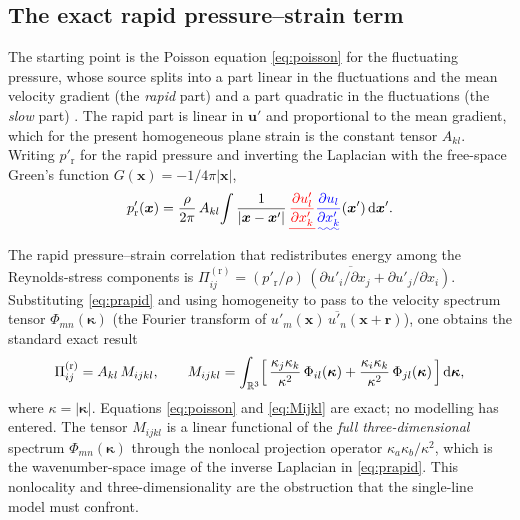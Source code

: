 \documentclass[lineno]{JFM-FLM_Au}
\providecommand{\DIFadd}[1]{{\protect\color{blue}\uwave{#1}}} %
\providecommand{\DIFdel}[1]{{\protect\color{red}\sout{#1}}} %
\providecommand{\DIFaddbegin}{} %
\providecommand{\DIFaddend}{} %
\providecommand{\DIFdelbegin}{} %
\providecommand{\DIFdelend}{} %
\begin{document}
\subsection{The exact rapid pressure--strain term}\label{sec:exact-pi}

The starting point is the Poisson equation \eqref{eq:poisson} for the
fluctuating pressure, whose source splits into a part linear in the
fluctuations and the mean velocity gradient (the \emph{rapid} part) and a
part quadratic in the fluctuations (the \emph{slow} part)
\citep{Pope2000}. The rapid part is linear in $\boldsymbol{u}'$ and
proportional to the mean gradient, which for the present homogeneous
plane strain is the constant tensor $A_{kl}$. Writing
$p'_{\mathrm r}$ for the rapid pressure and inverting the Laplacian with the
free-space Green's function $G(\boldsymbol{x})=-1/4\pi|\boldsymbol{x}|$,
\begin{equation}
  p'_{\mathrm r}(\boldsymbol{x})
  = \frac{\rho}{2\pi}\,A_{kl}\!\int
    \frac{1}{|\boldsymbol{x}-\boldsymbol{x}'|}\,
    \DIFdelbegin \DIFdel{\frac{\partial u'_l}{\partial x'_k}}\DIFdelend \DIFaddbegin \DIFadd{\frac{\partial u_l}{\partial x'_k}}\DIFaddend (\boldsymbol{x}')\,
    \mathrm{d}\boldsymbol{x}' .
  \label{eq:prapid}
\end{equation}
The rapid pressure--strain correlation that redistributes energy among the
Reynolds-stress components is
\DIFdelbegin \DIFdel{$\Pi^{(\mathrm r)}_{ij}
   = \overline{(p'_{\mathrm r}/\rho)\,(\partial u'_i/\partial x_j
     + \partial u'_j/\partial x_i)}$}\DIFdelend \DIFaddbegin \DIFadd{$\Pi^{(\mathrm r)}_{ij}
   = \overline{(p'_{\mathrm r}/\rho)\,(\partial u_i/\partial x_j
     + \partial u_j/\partial x_i)}$}\DIFaddend .
Substituting \eqref{eq:prapid} and using homogeneity to pass to the
velocity spectrum tensor
$\Phi_{mn}(\boldsymbol{\kappa})$
(the Fourier transform of \DIFdelbegin \DIFdel{$\overline{u'_m(\boldsymbol{x})\,
u'_n(\boldsymbol{x}+\boldsymbol{r})}$}\DIFdelend \DIFaddbegin \DIFadd{$\overline{u_m(\boldsymbol{x})\,
u_n(\boldsymbol{x}+\boldsymbol{r})}$}\DIFaddend ),
one obtains the standard exact result
\citep{BatchelorProudman1954,Crow1968,HuntCarruthers1990}
\begin{equation}
  \Pi^{(\mathrm r)}_{ij}
  = A_{kl}\,M_{ijkl},
  \qquad
  M_{ijkl}
  = \int_{\mathbb{R}^3}
    \Bigl[\,
      \frac{\kappa_j\kappa_k}{\kappa^2}\,\Phi_{il}(\boldsymbol{\kappa})
      + \frac{\kappa_i\kappa_k}{\kappa^2}\,\Phi_{jl}(\boldsymbol{\kappa})
    \,\Bigr]\,\mathrm{d}\boldsymbol{\kappa},
  \label{eq:Mijkl}
\end{equation}
where $\kappa=|\boldsymbol{\kappa}|$. Equations
\eqref{eq:poisson} and \eqref{eq:Mijkl} are exact; no modelling has entered. The
tensor $M_{ijkl}$ is a linear functional of the \emph{full three-dimensional}
spectrum $\Phi_{mn}(\boldsymbol{\kappa})$ through the nonlocal projection
operator $\kappa_a\kappa_b/\kappa^2$, which is the wavenumber-space image of
the inverse Laplacian in \eqref{eq:prapid}. This nonlocality and
three-dimensionality are the obstruction that the single-line model must
confront.
\end{document}
